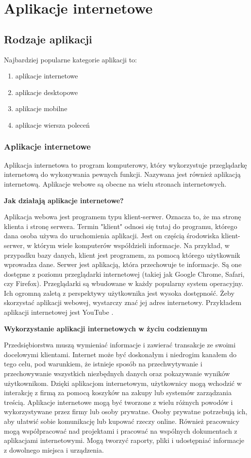 \chapter{Aplikacje internetowe}

\section{Rodzaje aplikacji}
Najbardziej popularne kategorie aplikacji \cite{typy-aplikacji} to:
\begin{enumerate}
    \item aplikacje internetowe
    \item aplikacje desktopowe
    \item aplikacje mobilne
    \item aplikacje wiersza poleceń
\end{enumerate}

\subsection{Aplikacje internetowe}
Aplikacja internetowa to program komputerowy, który wykorzystuje przeglądarkę internetową do wykonywania pewnych funkcji. Nazywana jest również aplikacją internetową. Aplikacje webowe są obecne na wielu stronach internetowych. 

\textbf{Jak działają aplikacje internetowe?}

Aplikacja webowa jest programem typu klient-serwer. Oznacza to, że ma stronę klienta i stronę serwera. Termin "klient" odnosi się tutaj do programu, którego dana osoba używa do uruchomienia aplikacji. Jest on częścią środowiska klient-serwer, w którym wiele komputerów współdzieli informacje. Na przykład, w przypadku bazy danych, klient jest programem, za pomocą którego użytkownik wprowadza dane. Serwer jest aplikacją, która przechowuje te informacje. Są one dostępne z poziomu przeglądarki internetowej (takiej jak Google Chrome, Safari, czy Firefox). Przeglądarki są wbudowane w każdy popularny system operacyjny. Ich ogromną zaletą z perspektywy użytkownika jest wysoka dostępność. Żeby skorzystać aplikacji webowej, wystarczy znać jej adres internetowy. Przykładem aplikacji internetowej jest YouTube \cite{youtube}.

\textbf{Wykorzystanie aplikacji internetowych w życiu codziennym}

Przedsiębiorstwa muszą wymieniać informacje i zawierać transakcje ze swoimi docelowymi klientami. Internet może być doskonałym i niedrogim kanałem do tego celu, pod warunkiem, że istnieje sposób na przechwytywanie i przechowywanie wszystkich niezbędnych danych oraz pokazywanie wyników użytkownikom. Dzięki aplikacjom internetowym, użytkownicy mogą wchodzić w interakcję z firmą za pomocą koszyków na zakupy lub systemów zarządzania treścią. Aplikacje internetowe mogą być tworzone z wielu różnych powodów i wykorzystywane przez firmy lub osoby prywatne. Osoby prywatne potrzebują ich, aby ułatwić sobie komunikację lub kupować rzeczy online. Również pracownicy mogą współpracować nad projektami i pracować na wspólnych dokumentach z aplikacjami internetowymi. Mogą tworzyć raporty, pliki i udostępniać informacje z dowolnego miejsca i urządzenia.

